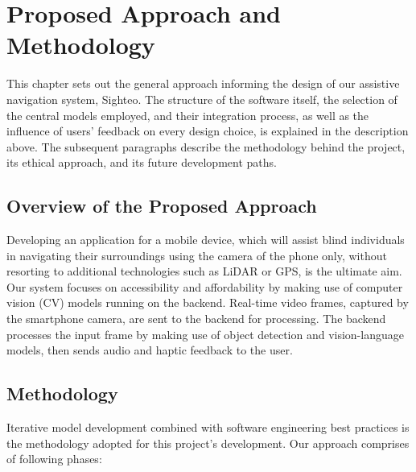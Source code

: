 \documentclass{FastFyp}
\begin{document}
\chapter{Proposed Approach and Methodology}
This chapter sets out the general approach informing the design of our assistive navigation system, Sighteo. The structure of the software itself, the selection of the central models employed, and their integration process, as well as the influence of users' feedback on every design choice, is explained in the description above. The subsequent paragraphs describe the methodology behind the project, its ethical approach, and its future development paths.

\section{Overview of the Proposed Approach}
Developing an application for a mobile device, which will assist blind individuals in navigating their surroundings using the camera of the phone only, without resorting to additional technologies such as LiDAR or GPS, is the ultimate aim. Our system focuses on accessibility and affordability by making use of computer vision (CV) models running on the backend. Real-time video frames, captured by the smartphone camera, are sent to the backend for processing. The backend processes the input frame by making use of object detection and vision-language models, then sends audio and haptic feedback to the user. 

\section{Methodology}
Iterative model development combined with software engineering best practices is the methodology adopted for this project's development. Our approach comprises of following phases:  
\end{document}
